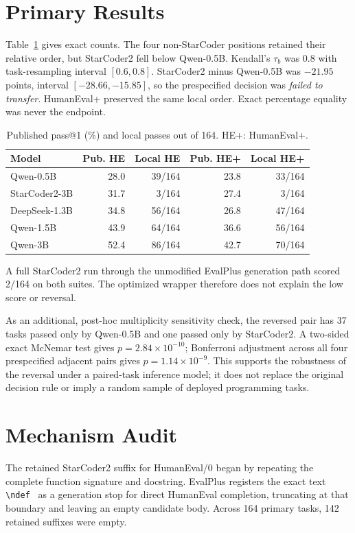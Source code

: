 \documentclass[10pt,conference]{IEEEtran}
\begin{document}
\section{Primary Results}
Table~\ref{tab:primary} gives exact counts. The four non-StarCoder positions
retained their relative order, but StarCoder2 fell below Qwen-0.5B. Kendall's
$\tau_b$ was 0.8 with task-resampling interval $[0.6,0.8]$. StarCoder2 minus
Qwen-0.5B was $-21.95$ points, interval $[-28.66,-15.85]$, so the prespecified
decision was \emph{failed to transfer}. HumanEval+ preserved the same local
order. Exact percentage equality was never the endpoint.

\begin{table}[t]
\caption{Published pass@1 (\%) and local passes out of 164. HE+: HumanEval+.}
\label{tab:primary}
\centering
\footnotesize
\setlength{\tabcolsep}{3.2pt}
\begin{tabular}{@{}lrrrr@{}}
\toprule
Model & Pub. HE & Local HE & Pub. HE+ & Local HE+ \\
\midrule
Qwen-0.5B & 28.0 & 39/164 & 23.8 & 33/164 \\
StarCoder2-3B & 31.7 & 3/164 & 27.4 & 3/164 \\
DeepSeek-1.3B & 34.8 & 56/164 & 26.8 & 47/164 \\
Qwen-1.5B & 43.9 & 64/164 & 36.6 & 56/164 \\
Qwen-3B & 52.4 & 86/164 & 42.7 & 70/164 \\
\bottomrule
\end{tabular}
\end{table}

A full StarCoder2 run through the unmodified EvalPlus generation path scored
2/164 on both suites. The optimized wrapper therefore does not explain the low
score or reversal.

As an additional, post-hoc multiplicity sensitivity check, the reversed pair
has 37 tasks passed only by Qwen-0.5B and one passed only by StarCoder2.
A two-sided exact McNemar test gives $p=2.84\times10^{-10}$; Bonferroni
adjustment across all four prespecified adjacent pairs gives
$p=1.14\times10^{-9}$. This supports the robustness of the reversal under a
paired-task inference model; it does not replace the original decision rule
or imply a random sample of deployed programming tasks.

\section{Mechanism Audit}
The retained StarCoder2 suffix for HumanEval/0 began by repeating the complete
function signature and docstring. EvalPlus registers the exact text
\verb|\ndef | as a generation stop for direct HumanEval completion, truncating
at that boundary and leaving an empty candidate body. Across 164 primary tasks,
142 retained suffixes were empty.
\end{document}
